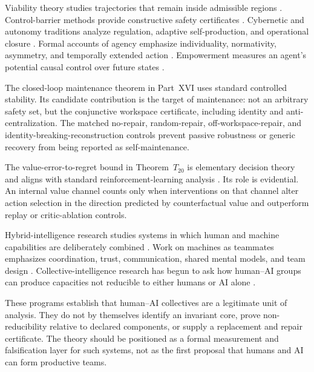 Viability theory studies trajectories that remain inside admissible regions
\cite{Aubin1991}. Control-barrier methods provide constructive safety
certificates \cite{AmesEtAl2017}. Cybernetic and autonomy traditions analyze
regulation, adaptive self-production, and operational closure
\cite{Ashby1956,MaturanaVarela1980,DiPaolo2005}. Formal accounts of agency
emphasize individuality, normativity, asymmetry, and temporally extended action
\cite{BarandiaranEtAl2009}. Empowerment measures an agent's potential causal
control over future states \cite{KlyubinEtAl2005}.

The closed-loop maintenance theorem in Part~XVI uses standard controlled
stability. Its candidate contribution is the target of maintenance: not an
arbitrary safety set, but the conjunctive workspace certificate, including
identity and anti-centralization. The matched no-repair, random-repair,
off-workspace-repair, and identity-breaking-reconstruction controls prevent
passive robustness or generic recovery from being reported as self-maintenance.


The value-error-to-regret bound in Theorem~\(T_{20}\) is elementary decision
theory and aligns with standard reinforcement-learning analysis
\cite{SuttonBarto2018}. Its role is evidential. An internal value channel
counts only when interventions on that channel alter action selection in the
direction predicted by counterfactual value and outperform replay or
critic-ablation controls.



Hybrid-intelligence research studies systems in which human and machine
capabilities are deliberately combined \cite{DellermannEtAl2019}. Work on
machines as teammates emphasizes coordination, trust, communication, shared
mental models, and team design \cite{SeeberEtAl2020}. Collective-intelligence
research has begun to ask how human--AI groups can produce capacities not
reducible to either humans or AI alone \cite{GuptaEtAl2025}.

These programs establish that human--AI collectives are a legitimate unit of
analysis. They do not by themselves identify an invariant core, prove
non-reducibility relative to declared components, or supply a replacement and
repair certificate. The theory should be positioned as a formal
measurement and falsification layer for such systems, not as the first proposal
that humans and AI can form productive teams.

